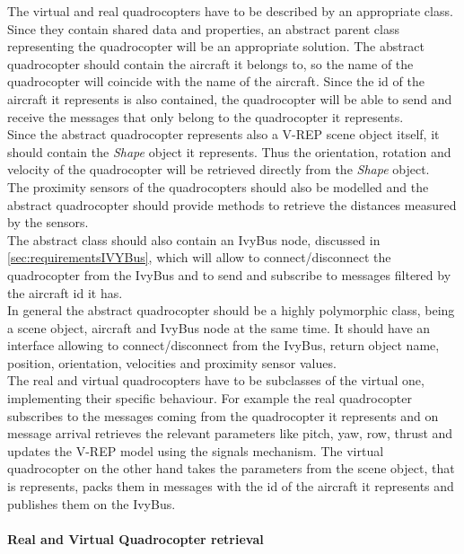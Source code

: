 The virtual and real quadrocopters have to be described by an appropriate class. \\
Since they contain shared data and properties, an abstract parent class representing the quadrocopter will be an appropriate solution. The abstract quadrocopter should contain the aircraft it belongs to, so the name of the quadrocopter will coincide with the name of the aircraft. Since the id of the aircraft it represents is also contained, the quadrocopter will be able to send and receive the messages that only belong to the quadrocopter it represents. \\
Since the abstract quadrocopter represents also a V-REP scene object itself, it should contain the \textit{Shape} object it represents. Thus the orientation, rotation and velocity of the quadrocopter will be retrieved directly from the \textit{Shape} object.\\
The proximity sensors of the quadrocopters should also be modelled and the abstract quadrocopter should provide methods to retrieve the distances measured by the sensors.\\
The abstract class should also contain an IvyBus node, discussed in \ref{sec:requirementsIVYBus}, which will allow to connect/disconnect the quadrocopter from the IvyBus and to send and subscribe to messages filtered by the aircraft id it has. \\
In general the abstract quadrocopter should be a highly polymorphic class, being a scene object, aircraft and IvyBus node at the same time. It should have an interface allowing to connect/disconnect from the IvyBus, return object name, position, orientation, velocities and proximity sensor values. \\
The real and virtual quadrocopters have to be subclasses of the virtual one, implementing their specific behaviour. For example the real quadrocopter subscribes to the messages coming from the quadrocopter it represents and on message arrival retrieves the relevant parameters like pitch, yaw, row, thrust and updates the V-REP model using the signals mechanism. The virtual quadrocopter on the other hand takes the parameters from the scene object, that is represents, packs them in messages with the id of the aircraft it represents and publishes them on the IvyBus.

\paragraph{Real and Virtual Quadrocopter retrieval}

